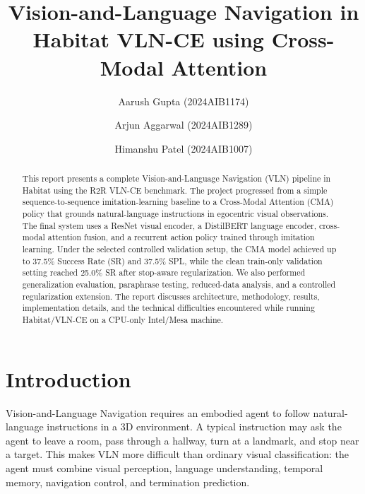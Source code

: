 \graphicspath{{figures/}}

\title{Vision-and-Language Navigation in Habitat VLN-CE using Cross-Modal Attention}

\author{Aarush Gupta (2024AIB1174)}
\email{}

\author{Arjun Aggarwal (2024AIB1289)}
\email{}

\author{Himanshu Patel (2024AIB1007)}
\email{}



\begin{abstract}
This report presents a complete Vision-and-Language Navigation (VLN) pipeline in Habitat using the R2R VLN-CE benchmark. The project progressed from a simple sequence-to-sequence imitation-learning baseline to a Cross-Modal Attention (CMA) policy that grounds natural-language instructions in egocentric visual observations. The final system uses a ResNet visual encoder, a DistilBERT language encoder, cross-modal attention fusion, and a recurrent action policy trained through imitation learning. Under the selected controlled validation setup, the CMA model achieved up to 37.5\% Success Rate (SR) and 37.5\% SPL, while the clean train-only validation setting reached 25.0\% SR after stop-aware regularization. We also performed generalization evaluation, paraphrase testing, reduced-data analysis, and a controlled regularization extension. The report discusses architecture, methodology, results, implementation details, and the technical difficulties encountered while running Habitat/VLN-CE on a CPU-only Intel/Mesa machine.
\end{abstract}

\maketitle

\section{Introduction}

Vision-and-Language Navigation requires an embodied agent to follow natural-language instructions in a 3D environment. A typical instruction may ask the agent to leave a room, pass through a hallway, turn at a landmark, and stop near a target. This makes VLN more difficult than ordinary visual classification: the agent must combine visual perception, language understanding, temporal memory, navigation control, and termination prediction.

